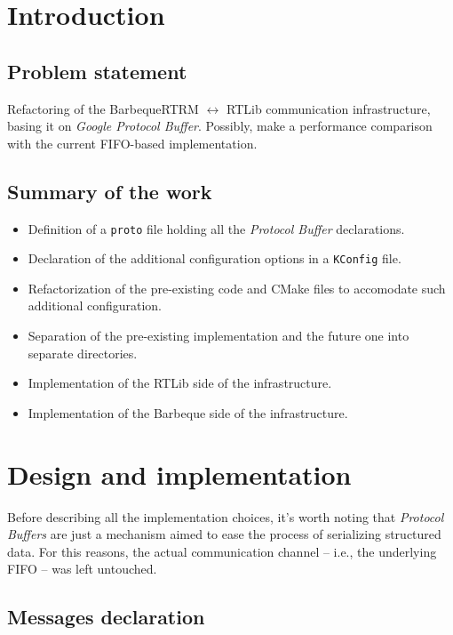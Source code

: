 \section{Introduction}


\subsection{Problem statement}
Refactoring of the BarbequeRTRM $\leftrightarrow$ RTLib communication infrastructure, basing it on \emph{Google Protocol Buffer}. Possibly, make a performance comparison with the current FIFO-based implementation.

\subsection{Summary of the work}
\begin{itemize}
    \item Definition of a \texttt{proto} file holding all the \emph{Protocol Buffer} declarations.
    \item Declaration of the additional configuration options in a \texttt{KConfig} file.
    \item Refactorization of the pre-existing code and CMake files to accomodate such additional configuration.
    \item Separation of the pre-existing implementation and the future one into separate directories.
    \item Implementation of the RTLib side of the infrastructure.
    \item Implementation of the Barbeque side of the infrastructure.
\end{itemize}

\pagebreak

\section{Design and implementation}

Before describing all the implementation choices, it's worth noting that \emph{Protocol Buffers} are just a mechanism aimed to ease the process of serializing structured data. For this reasons, the actual communication channel -- i.e., the underlying FIFO -- was left untouched.

\subsection{Messages declaration}
\label{sec:messages-declaration}

